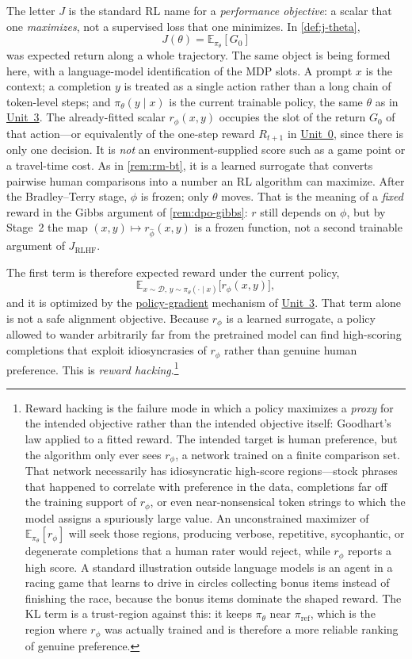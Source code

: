 \documentclass[11pt,a4paper]{article}
\newcommand{\jump}[2]{\hyperref[#1]{#2}}
\newcommand{\unitref}[1]{\hyperref[unit:#1]{Unit~#1}}
\theoremstyle{definition}
\begin{document}
\begin{remark}\label{rem:j-rlhf}
The letter $J$ is the standard RL name for a \emph{performance objective}: a scalar that
one \emph{maximizes}, not a supervised loss that one minimizes. In \cref{def:j-theta},
\[
J(\theta)=\mathbb{E}_{\pi_\theta}[G_0]
\]
was expected return along a whole trajectory. The same object is being formed here, with
a language-model identification of the MDP slots. A prompt $x$ is the context; a
completion $y$ is treated as a single action rather than a long chain of token-level
steps; and $\pi_\theta(y\mid x)$ is the current trainable policy, the same $\theta$ as in
\unitref{3}. The already-fitted scalar $r_\phi(x,y)$ occupies the slot of the return
$G_0$ of that action---or equivalently of the one-step reward $R_{t+1}$ in \unitref{0}, since
there is only one decision. It is \emph{not} an environment-supplied score such as a game
point or a travel-time cost. As in \cref{rem:rm-bt}, it is a learned surrogate that
converts pairwise human comparisons into a number an RL algorithm can maximize. After the
Bradley--Terry stage, $\phi$ is frozen; only $\theta$ moves.
That is the meaning of a \emph{fixed} reward in the Gibbs argument of
\cref{rem:dpo-gibbs}: $r$ still depends on $\phi$, but by Stage~2 the map
$(x,y)\mapsto r_{\widehat\phi}(x,y)$ is a frozen function, not a second trainable
argument of $J_{\mathrm{RLHF}}$.

The first term is therefore expected reward under the current policy,
\[
\mathbb{E}_{x\sim\mathcal{D},\,y\sim\pi_\theta(\cdot\mid x)}\bigl[r_\phi(x,y)\bigr],
\]
and it is optimized by the \jump{eq:policy-gradient}{policy-gradient} mechanism of
\unitref{3}. That term alone is not a safe alignment objective. Because $r_\phi$ is a
learned surrogate, a policy allowed to wander arbitrarily far from the pretrained model
can find high-scoring completions that exploit idiosyncrasies of $r_\phi$ rather than
genuine human preference. This is \emph{reward hacking}.\footnote{Reward hacking is the
failure mode in which a policy maximizes a \emph{proxy} for the intended objective rather
than the intended objective itself: Goodhart's law applied to a fitted reward. The
intended target is human preference, but the algorithm only ever sees $r_\phi$, a network
trained on a finite comparison set. That network necessarily has idiosyncratic
high-score regions---stock phrases that happened to correlate with preference in the
data, completions far off the training support of $r_\phi$, or even near-nonsensical
token strings to which the model assigns a spuriously large value. An unconstrained
maximizer of $\mathbb{E}_{\pi_\theta}[r_\phi]$ will seek those regions, producing
verbose, repetitive, sycophantic, or degenerate completions that a human rater would
reject, while $r_\phi$ reports a high score. A standard illustration outside language
models is an agent in a racing game that learns to drive in circles collecting bonus
items instead of finishing the race, because the bonus items dominate the shaped reward.
The KL term is a trust-region against this: it keeps $\pi_\theta$ near
$\pi_{\mathrm{ref}}$, which is the region where $r_\phi$ was actually trained and is
therefore a more reliable ranking of genuine preference.}


\end{remark}
\end{document}
